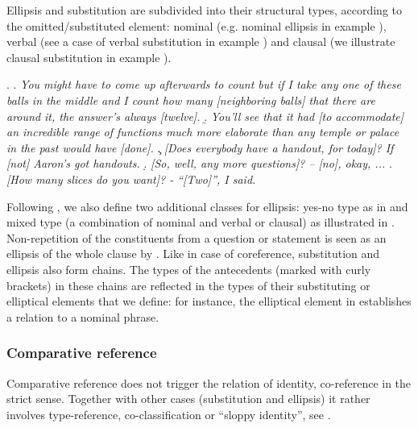 \documentclass[a4paper]{article}
\begin{document}
Ellipsis and substitution are subdivided into their structural types,
according to the omitted/substituted element: nominal (e.g. nominal
ellipsis in example \Next[a]), verbal (see a case of verbal substitution in
example \Next[b]) and clausal (we illustrate clausal substitution in example
\Next[c]).

\ex.
\a. {\sl You might have to come up afterwards to count but if I take
any one of these balls in the middle and I count how many
[neighboring balls] that there are around it, the answer's
always [twelve].}
\b. {\sl You'll see that it had [to accommodate] an incredible range
of functions much more elaborate than any temple or palace in
the past would have [done].}
\c. {\sl [Does everybody have a handout, for today]? If [not]
Aaron's got handouts.}
\d. {\sl [So, well, any more questions]? -- [no], okay, ...}
\e. {\sl [How many slices do you want]? - ``[Two]'', I said.}

Following \cite{Menzel2017}, we also define two additional classes for
ellipsis: yes-no type as in \Last[d] and mixed type (a combination of nominal
and verbal or clausal) as illustrated in \Last[e]. Non-repetition of the
constituents from a question or statement is seen as an ellipsis of the whole clause by \cite{HallidayHasan1976}. Like in case of coreference,
substitution and ellipsis also form chains. The types of the antecedents
(marked with curly brackets) in these chains are reflected in the types of
their substituting or elliptical elements that we define: for instance, the
elliptical element in \Last[a] establishes a relation to a nominal phrase.



\subsubsection{Comparative reference}\label{comp}

Comparative reference does not trigger the relation of identity, co-reference in the strict sense. Together with other cases (substitution and ellipsis) it rather involves type-reference, co-classification or ``sloppy identity'', see \cite{KunzSteiner2012}.
\end{document}
